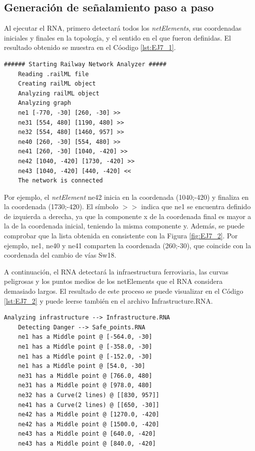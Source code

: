 \subsection{Generación de señalamiento paso a paso}

	Al ejecutar el RNA, primero detectará todos los \textit{netElements}, sus coordenadas iniciales y finales en la topología, y el sentido en el que fueron definidas. El resultado obtenido se muestra en el Cóodigo \ref{lst:EJ7_1}.
	
	\begin{lstlisting}[language = {}, caption = Detección de \textit{netElements} por parte del RNA , label = {lst:EJ7_1}]
	###### Starting Railway Network Analyzer #####
	Reading .railML file
	Creating railML object
	Analyzing railML object
	Analyzing graph
	ne1 [-770, -30] [260, -30] >>
	ne31 [554, 480] [1190, 480] >>
	ne32 [554, 480] [1460, 957] >>
	ne40 [260, -30] [554, 480] >>
	ne41 [260, -30] [1040, -420] >>
	ne42 [1040, -420] [1730, -420] >>
	ne43 [1040, -420] [440, -420] <<
	The network is connected
	\end{lstlisting}
	
	Por ejemplo, el \textit{netElement} ne42 inicia en la coordenada (1040;-420) y finaliza en la coordenada (1730;-420). El símbolo $>>$ indica que ne1 se encuentra definido de izquierda a derecha, ya que la componente x de la coordenada final es mayor a la de la coordenada inicial, teniendo la misma componente y. Además, se puede comprobar que la lista obtenida en consistente con la Figura \ref{fig:EJ7_2}. Por ejemplo, ne1, ne40 y ne41 comparten la coordenada (260;-30), que coincide con la coordenada del cambio de vías Sw18.
	
	A continuación, el RNA detectará la infraestructura ferroviaria, las curvas peligrosas y los puntos medios de los netElements que el RNA considera demasiado largos. El resultado de este proceso se puede visualizar en el Código \ref{lst:EJ7_2} y puede leerse también en el archivo Infrastructure.RNA.
	
	\begin{lstlisting}[language = {}, caption = Detección de puntos críticos por parte del RNA , label = {lst:EJ1_2}]
	Analyzing infrastructure --> Infrastructure.RNA
	Detecting Danger --> Safe_points.RNA
	ne1 has a Middle point @ [-564.0, -30]
	ne1 has a Middle point @ [-358.0, -30]
	ne1 has a Middle point @ [-152.0, -30]
	ne1 has a Middle point @ [54.0, -30]
	ne31 has a Middle point @ [766.0, 480]
	ne31 has a Middle point @ [978.0, 480]
	ne32 has a Curve(2 lines) @ [[830, 957]]
	ne41 has a Curve(2 lines) @ [[650, -30]]
	ne42 has a Middle point @ [1270.0, -420]
	ne42 has a Middle point @ [1500.0, -420]
	ne43 has a Middle point @ [640.0, -420]
	ne43 has a Middle point @ [840.0, -420]
	\end{lstlisting}
	
